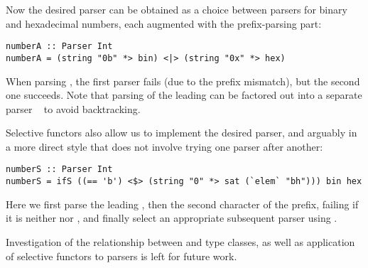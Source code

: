 \noindent
Now the desired parser can be obtained as a choice between parsers for binary
and hexadecimal numbers, each augmented with the prefix-parsing part:

\vspace{1mm}
\begin{verbatim}
numberA :: Parser Int
numberA = (string "0b" *> bin) <|> (string "0x" *> hex)
\end{verbatim}
\vspace{1mm}

\noindent
When parsing , the first parser fails (due to the prefix mismatch),
but the second one succeeds. Note that parsing of the leading  can be
factored out into a separate parser ~ to avoid backtracking.

Selective functors also allow us to implement the desired parser, and arguably
in a more direct style that does not involve trying one parser after another:

\vspace{1mm}
\begin{verbatim}
numberS :: Parser Int
numberS = ifS ((== 'b') <$> (string "0" *> sat (`elem` "bh"))) bin hex
\end{verbatim}
\vspace{1mm}

\noindent
Here we first parse the leading , then the second character of the
prefix, failing if it is neither  nor , and finally select an
appropriate subsequent parser using .

Investigation of the relationship between  and 
type classes, as well as application of selective functors to parsers is left
for future work.

